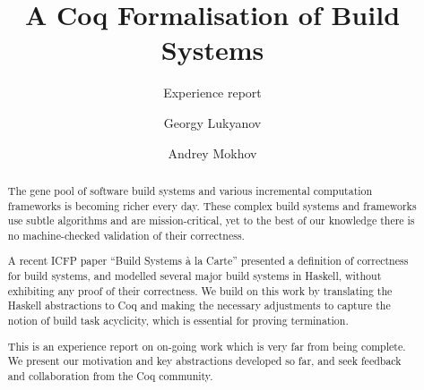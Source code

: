 \documentclass[sigplan,review]{acmart}\settopmatter{printfolios=true,printccs=false,printacmref=false}
\begin{document}
\title[]{A Coq Formalisation of Build Systems}         %
\subtitle{Experience report}                     %



\author{Georgy Lukyanov}

\author{Andrey Mokhov}

\begin{abstract}
The gene pool of software build systems and various incremental computation
frameworks is becoming richer every day. These complex build systems and
frameworks use subtle algorithms and are mission-critical, yet to the best of
our knowledge there is no machine-checked validation of their correctness.

A recent ICFP paper ``Build Systems \`a la Carte'' presented a definition of
correctness for build systems, and modelled several major build systems in
Haskell, without exhibiting any proof of their correctness. We build on this
work by translating the Haskell abstractions to Coq and making the necessary
adjustments to capture the notion of build task acyclicity, which is essential
for proving termination.

This is an experience report on on-going work which is very far from being
complete. We present our motivation and key abstractions developed so far, and
seek feedback and collaboration from the Coq community.
\end{abstract}
\end{document}
